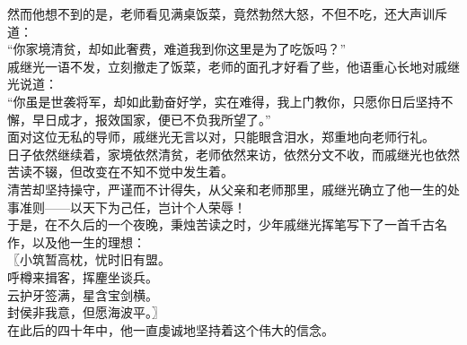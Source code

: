 \begin{multicols}{\theparacolNo}
然而他想不到的是，老师看见满桌饭菜，竟然勃然大怒，不但不吃，还大声训斥道：\\

“你家境清贫，却如此奢费，难道我到你这里是为了吃饭吗？”\\

戚继光一语不发，立刻撤走了饭菜，老师的面孔才好看了些，他语重心长地对戚继光说道：\\

“你虽是世袭将军，却如此勤奋好学，实在难得，我上门教你，只愿你日后坚持不懈，早日成才，报效国家，便已不负我所望了。”\\

面对这位无私的导师，戚继光无言以对，只能眼含泪水，郑重地向老师行礼。\\

日子依然继续着，家境依然清贫，老师依然来访，依然分文不收，而戚继光也依然苦读不辍，但改变在不知不觉中发生着。\\

清苦却坚持操守，严谨而不计得失，从父亲和老师那里，戚继光确立了他一生的处事准则——以天下为己任，岂计个人荣辱！\\

于是，在不久后的一个夜晚，秉烛苦读之时，少年戚继光挥笔写下了一首千古名作，以及他一生的理想：\\

〖小筑暂高枕，忧时旧有盟。\\

呼樽来揖客，挥麈坐谈兵。\\

云护牙签满，星含宝剑横。\\

封侯非我意，但愿海波平。〗\\

在此后的四十年中，他一直虔诚地坚持着这个伟大的信念。\\
\ifnum{}
	\end{multicols}
\fi
\newpage
